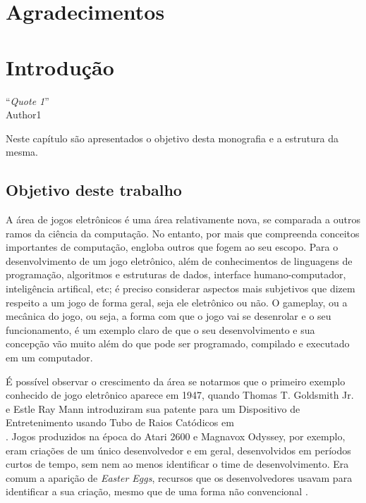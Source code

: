 \documentclass[brazil]{abnt}
\begin{document}
\chapter*{Agradecimentos}

\tableofcontents{}
\listoffigures
\listoftables

\chapter{Introdução\label{cap:introducao}}

\vfill{}
\begin{flushright}{}``\emph{Quote 1}''\\
{\small Author1}\end{flushright}{\small \par}
\vfill{}

Neste capítulo são apresentados o objetivo desta monografia e a estrutura
da mesma.
\newpage


\section{Objetivo deste trabalho}

A área de jogos eletrônicos é uma área relativamente nova, se comparada a outros ramos da ciência da computação. No entanto, por mais que compreenda conceitos importantes de computação, engloba outros que fogem ao seu escopo. Para o desenvolvimento de um jogo eletrônico, além de conhecimentos de linguagens de programação, algoritmos e estruturas de dados, interface humano-computador, inteligência artifical, etc; é preciso considerar aspectos mais subjetivos que dizem respeito a um jogo de forma geral, seja ele eletrônico ou não. O gameplay, ou a mecânica do jogo, ou seja, a forma com que o jogo vai se desenrolar e o seu funcionamento, é um exemplo claro de que o seu desenvolvimento e sua concepção vão muito além do que pode ser programado, compilado e executado em um computador.

É possível observar o crescimento da área se notarmos que o primeiro exemplo conhecido de jogo eletrônico aparece em 1947, quando Thomas T. Goldsmith Jr. e Estle Ray Mann introduziram sua patente para um Dispositivo de Entretenimento usando Tubo de Raios Catódicos em \\\cite{2455992}. Jogos produzidos na época do Atari 2600 e Magnavox Odyssey, por exemplo, eram criações de um único desenvolvedor e em geral, desenvolvidos em períodos curtos de tempo, sem nem ao menos identificar o time de desenvolvimento. Era comum a aparição de \textit{Easter Eggs}, recursos que os desenvolvedores usavam para identificar a sua criação, mesmo que de uma forma não convencional \cite{PrimeiroDevName}.
\end{document}
